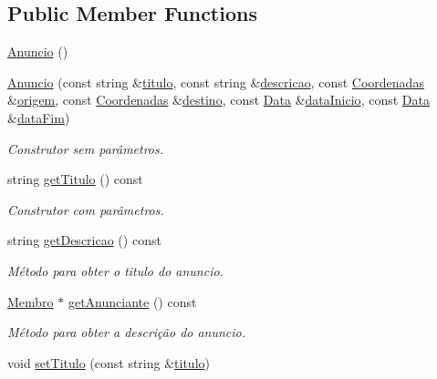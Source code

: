 \subsection*{Public Member Functions}
\begin{DoxyCompactItemize}
\item 
\hyperlink{class_anuncio_a97da342f390c8ee647d60cf29a923667}{Anuncio} ()
\item 
\hyperlink{class_anuncio_ad0adf24f36f64c2c786871e8f29ad8b5}{Anuncio} (const string \&\hyperlink{class_anuncio_adb34bedd8220f42b9ee37662c21313e6}{titulo}, const string \&\hyperlink{class_anuncio_aa6a9eb8d08cb06d16061b006eb2c8b97}{descricao}, const \hyperlink{class_coordenadas}{Coordenadas} \&\hyperlink{class_anuncio_a9b3f8ac29ebf2a44e24ea2273064a7f5}{origem}, const \hyperlink{class_coordenadas}{Coordenadas} \&\hyperlink{class_anuncio_acdac86595f84cfb8a2bf54c414857168}{destino}, const \hyperlink{class_data}{Data} \&\hyperlink{class_anuncio_abeb7d8c5fe5e7d127005044981a3cd3d}{data\+Inicio}, const \hyperlink{class_data}{Data} \&\hyperlink{class_anuncio_ac3b9182cc541cb68215f8aa09fb0e11a}{data\+Fim})
\begin{DoxyCompactList}\small\item\em Construtor sem parâmetros. \end{DoxyCompactList}\item 
string \hyperlink{class_anuncio_af712423e3645f7127f987d88793127d4}{get\+Titulo} () const 
\begin{DoxyCompactList}\small\item\em Construtor com parâmetros. \end{DoxyCompactList}\item 
string \hyperlink{class_anuncio_a693f59391a620851b4ac37063e8f4af4}{get\+Descricao} () const 
\begin{DoxyCompactList}\small\item\em Método para obter o titulo do anuncio. \end{DoxyCompactList}\item 
\hyperlink{class_membro}{Membro} $\ast$ \hyperlink{class_anuncio_a35c4c8b294b3bdda618a6a0708bf4647}{get\+Anunciante} () const 
\begin{DoxyCompactList}\small\item\em Método para obter a descrição do anuncio. \end{DoxyCompactList}\item 
void \hyperlink{class_anuncio_af95db56a1347160ef1cf53ea1ec659a6}{set\+Titulo} (const string \&\hyperlink{class_anuncio_adb34bedd8220f42b9ee37662c21313e6}{titulo})

\end{DoxyCompactItemize}
